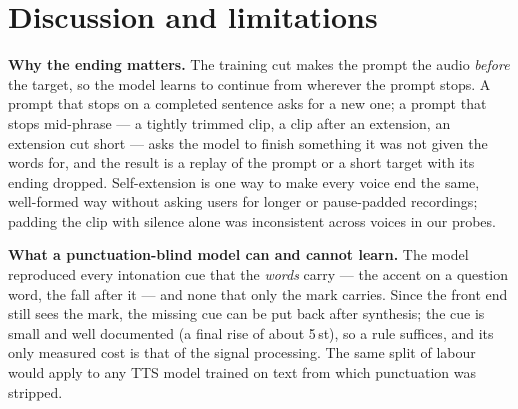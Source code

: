 \documentclass[conference]{IEEEtran}
\begin{document}
\section{Discussion and limitations}
\textbf{Why the ending matters.} The training cut makes the prompt the audio \emph{before} the target, so
the model learns to continue from wherever the prompt stops. A prompt that stops on a completed sentence
asks for a new one; a prompt that stops mid-phrase --- a tightly trimmed clip, a clip after an extension, an
extension cut short --- asks the model to finish something it was not given the words for, and the result
is a replay of the prompt or a short target with its ending dropped. Self-extension is one way to make every
voice end the same, well-formed way without asking users for longer or pause-padded recordings; padding the
clip with silence alone was inconsistent across voices in our probes.

\textbf{What a punctuation-blind model can and cannot learn.} The model reproduced every intonation cue
that the \emph{words} carry --- the accent on a question word, the fall after it --- and none that only the
mark carries. Since the front end still sees the mark, the missing cue can be put back after synthesis;
the cue is small and well documented (a final rise of about 5\,st), so a rule suffices, and its only
measured cost is that of the signal processing. The same split of labour would apply to any TTS model
trained on text from which punctuation was stripped.
\end{document}
